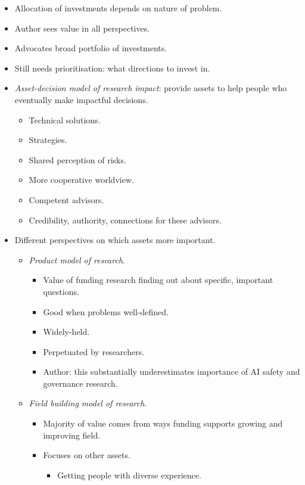 \begin{itemize}
    \item Allocation of investments depends on nature of problem.
    \item Author sees value in all perspectives.
    \item Advocates broad portfolio of investments.
    \item Still needs prioritisation: what directions to invest in.
    \item \emph{Asset-decision model of research impact}: provide assets to help people who eventually make impactful decisions.
    \begin{itemize}
        \item Technical solutions.
        \item Strategies.
        \item Shared perception of risks.
        \item More cooperative worldview.
        \item Competent advisors.
        \item Credibility, authority, connections for these advisors.
    \end{itemize}
    \item Different perspectives on which assets more important.
    \begin{itemize}
        \item \emph{Product model of research}.
        \begin{itemize}
            \item Value of funding research finding out about specific, important questions.
            \item Good when problems well-defined.
            \item Widely-held.
            \item Perpetuated by researchers.
            \item Author: this substantially underestimates importance of AI safety and governance research.
        \end{itemize}
        \item \emph{Field building model of research}.
        \begin{itemize}
            \item Majority of value comes from ways funding supports growing and improving field.
            \item Focuses on other assets.
            \begin{itemize}
                \item Getting people with diverse experience.

\end{itemize}
\end{itemize}
\end{itemize}
\end{itemize}

